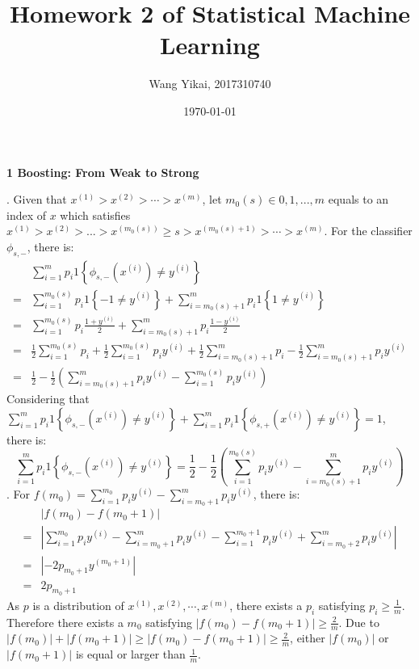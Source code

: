 \documentclass[12pt]{article}
\title{Homework 2 of Statistical Machine Learning}
\author{Wang Yikai, 2017310740}
\date{\today}
\begin{document}
\maketitle

{\large \bf 1 Boosting: From Weak to Strong}
\par
{}. Given that $x^{(1)}>x^{(2)}>\cdots>x^{(m)}$, let $m_0(s)\in{0,1,...,m}$ equals to an index of $x$ which satisfies $x^{(1)}>x^{(2)}>...>x^{(m_0(s))}\geq s>x^{(m_0(s)+1)}>\cdots>x^{(m)}$. For  the classifier $\phi_{s,-}$, there is:
\begin{align*}
&\sum_{i=1}^mp_i1\left\{\phi_{s,-}\left(x^{(i)}\right)\neq y^{(i)}\right\}\\
=&\sum_{i=1}^{m_0(s)}p_i1\left\{-1\neq y^{(i)}\right\}+\sum_{i=m_0(s)+1}^{m}p_i1\left\{1\neq y^{(i)}\right\}\\
=&\sum_{i=1}^{m_0(s)}p_i\frac{1+y^{(i)}}{2}+\sum_{i=m_0(s)+1}^{m}p_i\frac{1-y^{(i)}}{2}\\
=&\frac{1}{2}\sum_{i=1}^{m_0(s)}p_i+\frac{1}{2}\sum_{i=1}^{m_0(s)}p_i y^{(i)}+\frac{1}{2}\sum_{i=m_0(s)+1}^{m}p_i-\frac{1}{2}\sum_{i=m_0(s)+1}^{m}p_i y^{(i)}\\
=&\frac{1}{2}-\frac{1}{2}\left(\sum_{i=m_0(s)+1}^{m}p_i y^{(i)}-\sum_{i=1}^{m_0(s)}p_i y^{(i)}\right)
\end{align*}
Considering that $\sum_{i=1}^mp_i1\left\{\phi_{s,-}\left(x^{(i)}\right)\neq y^{(i)}\right\}+\sum_{i=1}^mp_i1\left\{\phi_{s,+}\left(x^{(i)}\right)\neq y^{(i)}\right\}=1$, there is:
$$\sum_{i=1}^mp_i1\left\{\phi_{s,-}\left(x^{(i)}\right)\neq y^{(i)}\right\}=\frac{1}{2}-\frac{1}{2}\left(\sum_{i=1}^{m_0(s)}p_i y^{(i)}-\sum_{i=m_0(s)+1}^{m}p_i y^{(i)}\right)$$
. For $f(m_0)=\sum_{i=1}^{m_0}p_i y^{(i)}-\sum_{i=m_0+1}^{m}p_i y^{(i)}$, there is:
\begin{align*}
&\left|f(m_0)-f(m_0+1)\right|\\
=&\left|\sum_{i=1}^{m_0}p_i y^{(i)}-\sum_{i=m_0+1}^{m}p_i y^{(i)}-\sum_{i=1}^{m_0+1}p_i y^{(i)}+\sum_{i=m_0+2}^{m}p_i y^{(i)}\right|\\
=&\left|-2p_{m_0+1}y^{(m_0+1)}\right|\\
=&2p_{m_0+1}
\end{align*}
As $p$ is a distribution of $x^{(1)},x^{(2)},\cdots,x^{(m)}$, there exists a $p_i$ satisfying $p_i\geq\frac{1}{m}$. Therefore there exists a $m_0$ satisfying $\left|f(m_0)-f(m_0+1)\right|\geq\frac{2}{m}$. Due to $\left|f(m_0)\right|+\left|f(m_0+1)\right|\geq\left|f(m_0)-f(m_0+1)\right|\geq\frac{2}{m}$, either $\left|f(m_0)\right|$ or $\left|f(m_0+1)\right|$ is equal or larger than $\frac{1}{m}$.
\end{document}

